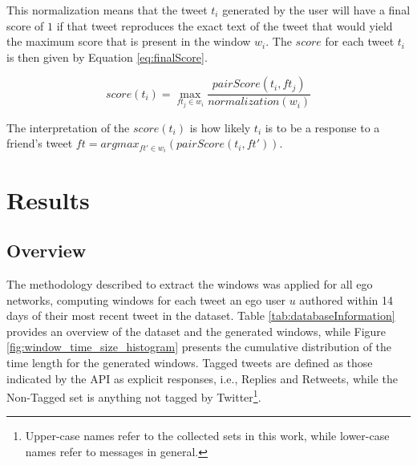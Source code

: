 This normalization means that the tweet $t_i$ generated by the user will have a final score of $1$ if that tweet reproduces the exact text of the tweet that would yield the maximum score that is present in the window $w_i$. The $score$ for each tweet $t_i$ is then given by Equation \ref{eq:finalScore}.

\begin{equation}
score(t_i) =  \max_{ft_j \in w_i}\frac{pairScore(t_i,ft_j)}{normalization(w_i)}
\label{eq:finalScore}
\end{equation}

The interpretation of the $score(t_i)$ is how likely $t_i$ is to be a response to a friend's tweet $ft = argmax_{ft' \in w_i}(pairScore(t_i,ft'))$.


\section{Results}

\subsection{Overview}

The methodology described to extract the windows was applied for all \totalUsers{} ego networks, computing windows for each tweet an ego user $u$ authored within 14 days of their most recent tweet in the dataset. 
Table \ref{tab:databaseInformation} provides an overview of the dataset and the generated windows, while Figure \ref{fig:window_time_size_histogram} presents the cumulative distribution of the time length for the generated windows.  
Tagged tweets are defined as those indicated by the API as explicit responses, i.e., Replies and Retweets, while the Non-Tagged set is anything not tagged by Twitter\footnote{\label{datasets}Upper-case names refer to the collected sets in this work, while lower-case names refer to messages in general.}. 

